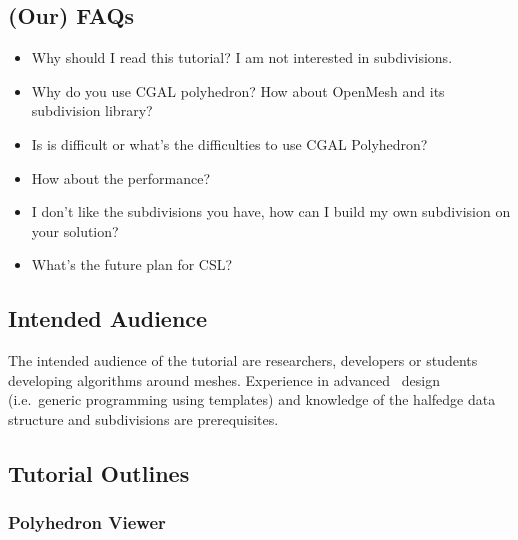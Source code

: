 \documentclass[letter,twocolumn]{article}
\begin{document}
\subsection*{(Our) FAQs}

\begin{itemize}
\item Why should I read this tutorial? I am not interested in subdivisions. 
\item Why do you use CGAL polyhedron? How about OpenMesh and its 
subdivision library?
\item Is is difficult or what's the difficulties to use CGAL Polyhedron?
\item How about the performance?
\item I don't like the subdivisions you have, how can I build my own 
subdivision on your solution?
\item What's the future plan for CSL? 
\end{itemize}

\subsection*{Intended Audience}

The intended audience of the tutorial are researchers, developers or
students developing algorithms around meshes. Experience in advanced
\CC\ design (i.e.\ generic programming using templates) and knowledge
of the halfedge data structure and subdivisions are prerequisites.


\subsection*{Tutorial Outlines}

\subsubsection*{Polyhedron Viewer}
\end{document}
